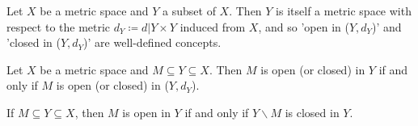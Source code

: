 Let \(X\) be a metric space and \(Y\) a subset of \(X\). Then \(Y\) is itself a metric space
with respect to the metric \(d_Y \coloneqq d|Y \times Y\) induced from \(X\), and so 'open 
in (\(Y, d_Y\))' and 'closed in (\(Y, d_Y\))' are well-defined concepts. 

\begin{proposition}
    Let \(X\) be a metric space and \(M \subseteq Y \subseteq X\). Then \(M\) is open (or closed)
    in \(Y\) if and only if \(M\) is open (or closed) in (\(Y, d_Y\)). 
\end{proposition}

\begin{corollary}
    If \(M \subseteq Y \subseteq X\), then \(M\) is open in \(Y\) if and only if \(Y\backslash M\)
    is closed in \(Y\). 
\end{corollary}




